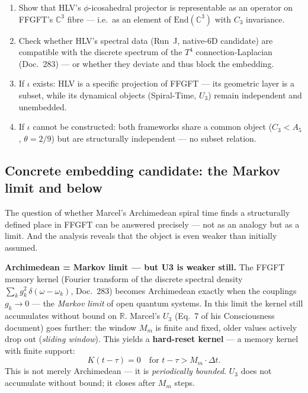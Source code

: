 \begin{enumerate}
  \item Show that HLV's $\phi$-icosahedral projector is representable as
    an operator on FFGFT's $\mathbb{C}^3$ fibre --- i.e.\ as an element
    of $\mathrm{End}(\mathbb{C}^3)$ with $C_3$ invariance.
  \item Check whether HLV's spectral data (Run~J, native-6D candidate)
    are compatible with the discrete spectrum of the $T^4$
    connection-Laplacian (Doc.~283) --- or whether they deviate and thus
    block the embedding.
  \item If $\iota$ exists: HLV is a specific projection of FFGFT --- its
    geometric layer is a subset, while its dynamical objects (Spiral-Time,
    $U_3$) remain independent and unembedded.
  \item If $\iota$ cannot be constructed: both frameworks share a common
    object ($C_3 < A_5$, $\theta = 2/9$) but are structurally independent
    --- no subset relation.
\end{enumerate}

\subsection*{Concrete embedding candidate: the Markov limit and below}

The question of whether Marcel's Archimedean spiral time finds a
structurally defined place in FFGFT can be answered precisely --- not as
an analogy but as a limit. And the analysis reveals that the object is
even weaker than initially assumed.

\textbf{Archimedean = Markov limit --- but U3 is weaker still.} The FFGFT
memory kernel (Fourier transform of the discrete spectral density $\sum_k
g_k^2\,\delta(\omega-\omega_k)$, Doc.~283) becomes Archimedean exactly
when the couplings $g_k \to 0$ --- the \emph{Markov limit} of open
quantum systems. In this limit the kernel still accumulates without bound
on $\mathbb{R}$. Marcel's $U_3$ (Eq.~7 of his Consciousness document)
goes further: the window $M_m$ is finite and fixed, older values actively
drop out (\emph{sliding window}). This yields a \textbf{hard-reset kernel}
--- a memory kernel with finite support:
\begin{equation}
  K(t-\tau) = 0 \quad \text{for } t-\tau > M_m\cdot\Delta t.
\end{equation}
This is not merely Archimedean --- it is \emph{periodically bounded}.
$U_3$ does not accumulate without bound; it closes after $M_m$ steps.

